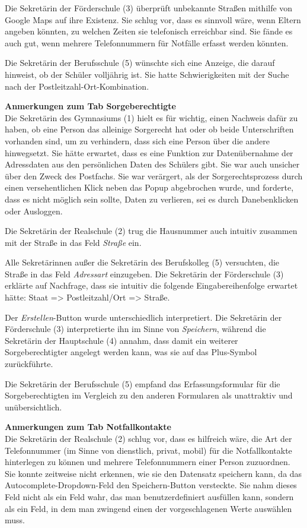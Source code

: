 Die Sekretärin der Förderschule (3) überprüft unbekannte Straßen mithilfe von Google Maps auf ihre Existenz. Sie schlug vor, dass es sinnvoll wäre, wenn Eltern angeben könnten, zu welchen Zeiten sie telefonisch erreichbar sind. Sie fände es auch gut, wenn mehrere Telefonnummern für Notfälle erfasst werden könnten.

Die Sekretärin der Berufsschule (5) wünschte sich eine Anzeige, die darauf hinweist, ob der Schüler volljährig ist. Sie hatte Schwierigkeiten mit der Suche nach der Postleitzahl-Ort-Kombination.

\textbf{Anmerkungen zum Tab \glqq Sorgeberechtigte\grqq{}}\\
Die Sekretärin des Gymnasiums (1) hielt es für wichtig, einen Nachweis dafür zu haben, ob eine Person das alleinige Sorgerecht hat oder ob beide Unterschriften vorhanden sind, um zu verhindern, dass sich eine Person über die andere hinwegsetzt. Sie hätte erwartet, dass es eine Funktion zur Datenübernahme der Adressdaten aus den persönlichen Daten des Schülers gibt. Sie war auch unsicher über den Zweck des Postfachs. Sie war verärgert, als der Sorgerechtsprozess durch einen versehentlichen Klick neben das Popup abgebrochen wurde, und forderte, dass es nicht möglich sein sollte, Daten zu verlieren, sei es durch Danebenklicken oder Ausloggen.

Die Sekretärin der Realschule (2) trug die Hausnummer auch intuitiv zusammen mit der Straße in das Feld \textit{Straße} ein.

Alle Sekretärinnen außer die Sekretärin des Berufskolleg (5) versuchten, die Straße in das Feld \textit{Adressart} einzugeben. Die Sekretärin der Förderschule (3) erklärte auf Nachfrage, dass sie intuitiv die folgende Eingabereihenfolge erwartet hätte: Staat => Postleitzahl/Ort => Straße.

Der \textit{Erstellen}-Button wurde unterschiedlich interpretiert. Die Sekretärin der Förderschule (3) interpretierte ihn im Sinne von \textit{Speichern}, während die Sekretärin der Hauptschule (4) annahm, dass damit ein weiterer Sorgeberechtigter angelegt werden kann, was sie auf das Plus-Symbol zurückführte.

Die Sekretärin der Berufsschule (5) empfand das Erfassungsformular für die Sorgeberechtigten im Vergleich zu den anderen Formularen als unattraktiv und unübersichtlich.

\textbf{Anmerkungen zum Tab \glqq Notfallkontakte\grqq{}}\\
Die Sekretärin der Realschule (2) schlug vor, dass es hilfreich wäre, die Art der Telefonnummer (im Sinne von dienstlich, privat, mobil) für die Notfallkontakte hinterlegen zu können und mehrere Telefonnummern einer Person zuzuordnen. Sie konnte zeitweise nicht erkennen, wie sie den Datensatz speichern kann, da das Autocomplete-Dropdown-Feld den Speichern-Button versteckte. Sie nahm dieses Feld nicht als ein Feld wahr, das man benutzerdefiniert ausfüllen kann, sondern als ein Feld, in dem man zwingend einen der vorgeschlagenen Werte auswählen muss.

